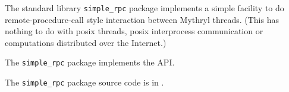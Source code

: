
The standard library {\tt simple\_rpc} package implements 
a simple facility to 
do remote-procedure-call style interaction between Mythryl threads. (This 
has nothing to do with posix threads, posix interprocess communication 
or computations distributed over the Internet.)

The {\tt simple\_rpc} package implements the  API.

The {\tt simple\_rpc} package source code is in .




